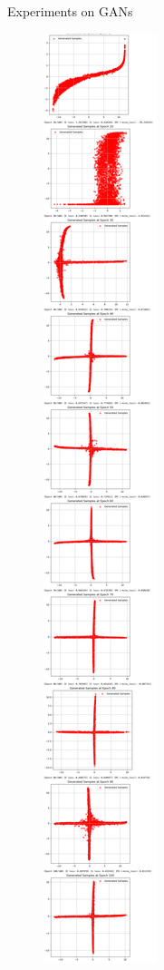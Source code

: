 \documentclass[final]{beamer}
\newlength{\colwidth}
\begin{document}
\begin{frame}[t]
\begin{columns}[t]
\begin{column}{\colwidth}
\begin{block}{Experiments on GANs}
    \begin{figure}
    \centering
    \begin{minipage}{0.19\textwidth}
    \centering
    \includegraphics[width=1\linewidth]{gan_cross/Jietu20250101-004224@2x.png}

\end{minipage}
\end{figure}
\end{block}
\end{column}
\end{columns}
\end{frame}
\end{document}
